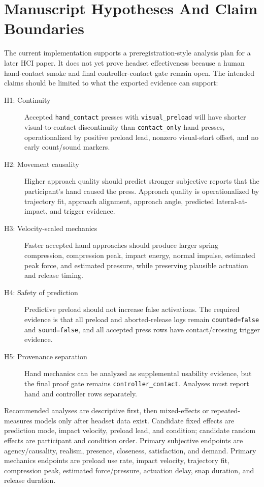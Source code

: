 \documentclass[11pt]{article}
\begin{document}
\section{Manuscript Hypotheses And Claim Boundaries}
The current implementation supports a preregistration-style analysis plan for a later HCI paper. It does not yet prove headset effectiveness because a human hand-contact smoke and final controller-contact gate remain open. The intended claims should be limited to what the exported evidence can support:
\begin{description}
  \item[H1: Continuity] Accepted \texttt{hand\_contact} presses with \texttt{visual\_preload} will have shorter visual-to-contact discontinuity than \texttt{contact\_only} hand presses, operationalized by positive preload lead, nonzero visual-start offset, and no early count/sound markers.
  \item[H2: Movement causality] Higher approach quality should predict stronger subjective reports that the participant's hand caused the press. Approach quality is operationalized by trajectory fit, approach alignment, approach angle, predicted lateral-at-impact, and trigger evidence.
  \item[H3: Velocity-scaled mechanics] Faster accepted hand approaches should produce larger spring compression, compression peak, impact energy, normal impulse, estimated peak force, and estimated pressure, while preserving plausible actuation and release timing.
  \item[H4: Safety of prediction] Predictive preload should not increase false activations. The required evidence is that all preload and aborted-release logs remain \texttt{counted=false} and \texttt{sound=false}, and all accepted press rows have contact/crossing trigger evidence.
  \item[H5: Provenance separation] Hand mechanics can be analyzed as supplemental usability evidence, but the final proof gate remains \texttt{controller\_contact}. Analyses must report hand and controller rows separately.
\end{description}

Recommended analyses are descriptive first, then mixed-effects or repeated-measures models only after headset data exist. Candidate fixed effects are prediction mode, impact velocity, preload lead, and condition; candidate random effects are participant and condition order. Primary subjective endpoints are agency/causality, realism, presence, closeness, satisfaction, and demand. Primary mechanics endpoints are preload use rate, impact velocity, trajectory fit, compression peak, estimated force/pressure, actuation delay, snap duration, and release duration.
\end{document}
